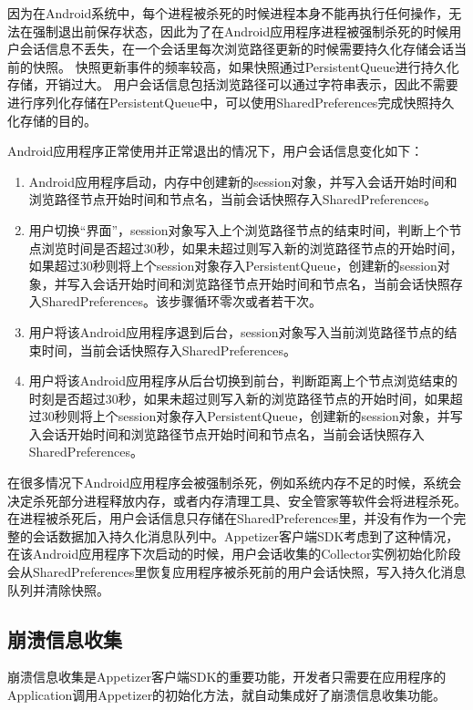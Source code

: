 因为在Android系统中，每个进程被杀死的时候进程本身不能再执行任何操作，无法在强制退出前保存状态，因此为了在Android应用程序进程被强制杀死的时候用户会话信息不丢失，在一个会话里每次浏览路径更新的时候需要持久化存储会话当前的快照。
快照更新事件的频率较高，如果快照通过PersistentQueue进行持久化存储，开销过大。
用户会话信息包括浏览路径可以通过字符串表示，因此不需要进行序列化存储在PersistentQueue中，可以使用SharedPreferences完成快照持久化存储的目的。

Android应用程序正常使用并正常退出的情况下，用户会话信息变化如下：

\begin{enumerate}
	\item Android应用程序启动，内存中创建新的session对象，并写入会话开始时间和浏览路径节点开始时间和节点名，当前会话快照存入SharedPreferences。
	\item 用户切换“界面”，session对象写入上个浏览路径节点的结束时间，判断上个节点浏览时间是否超过30秒，如果未超过则写入新的浏览路径节点的开始时间，如果超过30秒则将上个session对象存入PersistentQueue，创建新的session对象，并写入会话开始时间和浏览路径节点开始时间和节点名，当前会话快照存入SharedPreferences。该步骤循环零次或者若干次。
	\item 用户将该Android应用程序退到后台，session对象写入当前浏览路径节点的结束时间，当前会话快照存入SharedPreferences。
	\item 用户将该Android应用程序从后台切换到前台，判断距离上个节点浏览结束的时刻是否超过30秒，如果未超过则写入新的浏览路径节点的开始时间，如果超过30秒则将上个session对象存入PersistentQueue，创建新的session对象，并写入会话开始时间和浏览路径节点开始时间和节点名，当前会话快照存入SharedPreferences。
\end{enumerate} 

在很多情况下Android应用程序会被强制杀死，例如系统内存不足的时候，系统会决定杀死部分进程释放内存，或者内存清理工具、安全管家等软件会将进程杀死。在进程被杀死后，用户会话信息只存储在SharedPreferences里，并没有作为一个完整的会话数据加入持久化消息队列中。Appetizer客户端SDK考虑到了这种情况，在该Android应用程序下次启动的时候，用户会话收集的Collector实例初始化阶段会从SharedPreferences里恢复应用程序被杀死前的用户会话快照，写入持久化消息队列并清除快照。

\subsection{崩溃信息收集}
\label{subsec:crashCollector}

崩溃信息收集是Appetizer客户端SDK的重要功能，开发者只需要在应用程序的Application调用Appetizer的初始化方法，就自动集成好了崩溃信息收集功能。

